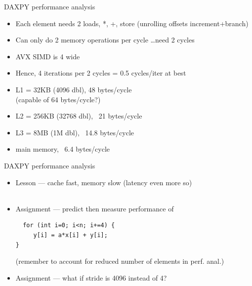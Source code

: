 \begin{frame}[fragile]{DAXPY performance analysis}
  \begin{itemize}
  \item Each element needs 2 loads, *, +, store (unrolling offsets increment+branch)
  \item Can only do 2 memory operations per cycle \ldots need 2 cycles
  \item AVX SIMD is 4 wide
  \item Hence, 4 iterations per 2 cycles = 0.5 cycles/iter at best
  \item L1 = 32KB (4096 dbl), 48 bytes/cycle \\
  (capable of 64 bytes/cycle?)
  \item L2 = 256KB (32768 dbl), ~21 bytes/cycle
  \item L3 = 8MB (1M dbl), ~14.8 bytes/cycle
  \item main memory, ~6.4 bytes/cycle
  \end{itemize}
  
\end{frame}

\begin{frame}[fragile]{DAXPY performance analysis}
  \begin{itemize}
  \item Lesson --- cache fast, memory slow (latency even more so)
  \\
  \ 
  \item Assignment --- predict then measure performance of
\begin{verbatim}
  for (int i=0; i<n; i+=4) {
     y[i] = a*x[i] + y[i];
}
\end{verbatim}
  (remember to account for reduced number of elements in perf. anal.)
  \item Assignment --- what if stride is 4096 instead of 4?
  \end{itemize}
  
\end{frame}


